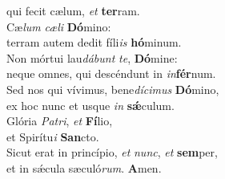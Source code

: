 \evenverse qui fecit cælum, \textit{et} \textbf{ter}ram.\\
\oddverse Cæ\textit{lum} \textit{cæ}\textit{li} \textbf{Dó}mino:~\*\\
\oddverse terram autem dedit fíli\textit{is} \textbf{hó}minum.\\
\evenverse Non mórtui lau\textit{dá}\textit{bunt} \textit{te}, \textbf{Dó}mine:~\*\\
\evenverse neque omnes, qui descéndunt in \textit{in}\textbf{fér}num.\\
\oddverse Sed nos qui vívimus, bene\textit{dí}\textit{ci}\textit{mus} \textbf{Dó}mino,~\*\\
\oddverse ex hoc nunc et usque \textit{in} \textbf{sǽ}culum.\\
\evenverse Glória \textit{Pa}\textit{tri}, \textit{et} \textbf{Fí}lio,~\*\\
\evenverse et Spirítu\textit{i} \textbf{San}cto.\\
\oddverse Sicut erat in princípio, \textit{et} \textit{nunc}, \textit{et} \textbf{sem}per,~\*\\
\oddverse et in sǽcula sæculó\textit{rum}. \textbf{A}men.\\
